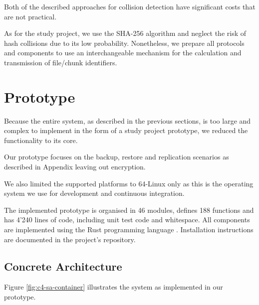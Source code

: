 Both of the described approaches for collision detection have significant costs that are not practical.

As for the study project, we use the SHA-256 algorithm\cite{sha-256} and neglect the risk of hash collisions due to its low probability. Nonetheless, we prepare all protocols and components to use an interchangeable mechanism for the calculation and transmission of file/chunk identifiers.

\section{Prototype}\label{sec:prototype}

Because the entire system, as described in the previous sections, is too large and complex to implement in the form of a study project prototype, we reduced the functionality to its core.

Our prototype focuses on the backup, restore and replication scenarios as described in Appendix  leaving out encryption.

We also limited the supported platforms to 64-Linux only as this is the operating system we use for development and continuous integration.

The implemented prototype is organised in 46 modules, defines 188 functions and has 4'240 lines of code, including unit test code and whitespace. All components are implemented using the Rust programming language \cite{rustlang-org}. Installation instructions are documented in the project's repository.

\subsection{Concrete Architecture}

Figure \ref{fig:c4-sa-container} illustrates the system as implemented in our prototype.

